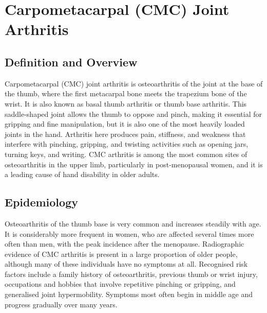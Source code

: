 \chapter{Carpometacarpal (CMC) Joint Arthritis}

\section*{Definition and Overview}
Carpometacarpal (CMC) joint arthritis is osteoarthritis of the joint at the base of the thumb, where the first metacarpal bone meets the trapezium bone of the wrist. It is also known as basal thumb arthritis or thumb base arthritis. This saddle-shaped joint allows the thumb to oppose and pinch, making it essential for gripping and fine manipulation, but it is also one of the most heavily loaded joints in the hand. Arthritis here produces pain, stiffness, and weakness that interfere with pinching, gripping, and twisting activities such as opening jars, turning keys, and writing. CMC arthritis is among the most common sites of osteoarthritis in the upper limb, particularly in post-menopausal women, and it is a leading cause of hand disability in older adults.

\section*{Epidemiology}
Osteoarthritis of the thumb base is very common and increases steadily with age. It is considerably more frequent in women, who are affected several times more often than men, with the peak incidence after the menopause. Radiographic evidence of CMC arthritis is present in a large proportion of older people, although many of these individuals have no symptoms at all. Recognised risk factors include a family history of osteoarthritis, previous thumb or wrist injury, occupations and hobbies that involve repetitive pinching or gripping, and generalised joint hypermobility. Symptoms most often begin in middle age and progress gradually over many years.

